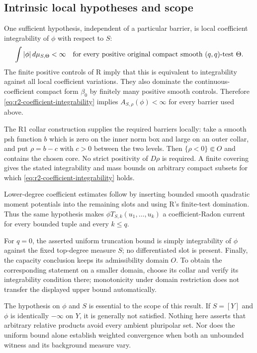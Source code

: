 \documentclass[11pt,a4paper]{article}
\numberwithin{equation}{section}
\theoremstyle{definition}
\theoremstyle{remark}
\begin{document}
\subsection{Intrinsic local hypotheses and scope}

One sufficient hypothesis, independent of a particular barrier, is
local coefficient integrability of $\phi$ with respect to $S$:
\begin{equation}
\label{eq:r2-coefficient-integrability}
 \int|\phi|\,d\mu_{S,\Theta}<\infty
 \quad\hbox{for every positive original compact smooth
 $(q,q)$-test $\Theta$.}
\end{equation}
The finite positive controls of R imply that this is equivalent
to integrability against all local coefficient variations.
They also dominate the continuous-coefficient compact form
$\beta_0$ by finitely many positive smooth controls. Therefore
\eqref{eq:r2-coefficient-integrability} implies
$A_{S,\rho}(\phi)<\infty$ for every barrier used above.

The R1 collar construction supplies the required barriers locally:
take a smooth psh function $b$ which is zero on the inner norm box
and large on an outer collar, and put $\rho=b-c$ with $c>0$
between the two levels. Then $\{\rho<0\}\Subset O$ and contains
the chosen core. No strict positivity of $D\rho$ is required.
A finite covering gives the stated integrability and mass bounds
on arbitrary compact subsets for which
\eqref{eq:r2-coefficient-integrability} holds.

Lower-degree coefficient estimates follow by inserting bounded
smooth quadratic moment potentials into the remaining slots and
using R's finite-test domination. Thus the same hypothesis makes
$\phi T_{S,k}(u_1,\ldots,u_k)$ a coefficient-Radon current for
every bounded tuple and every $k\leq q$.

For $q=0$, the asserted uniform truncation bound is simply
integrability of $\phi$ against the fixed top-degree measure $S$;
no differentiated slot is present. Finally, the capacity conclusion
keeps its admissibility domain $O$. To obtain the corresponding
statement on a smaller domain, choose its collar and verify its
integrability condition there; monotonicity under domain restriction
does not transfer the displayed upper bound automatically.

The hypothesis on $\phi$ and $S$ is essential to the scope of this
result. If $S=[Y]$ and $\phi$ is identically $-\infty$ on $Y$,
it is generally not satisfied. Nothing here asserts that arbitrary
relative products avoid every ambient pluripolar set. Nor does the
uniform bound alone establish weighted convergence when both an
unbounded witness and its background measure vary.
\end{document}
